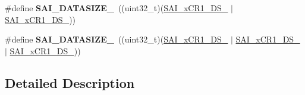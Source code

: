 \begin{DoxyCompactItemize}
\item 
\#define {\bfseries S\+A\+I\+\_\+\+D\+A\+T\+A\+S\+I\+Z\+E\+\_}~((uint32\+\_\+t)(\hyperlink{group___peripheral___registers___bits___definition_gab50b27e8638b16d12ef00e80bf0f097e}{S\+A\+I\+\_\+x\+C\+R1\+\_\+\+D\+S\+\_} $\vert$ \hyperlink{group___peripheral___registers___bits___definition_ga4148a11a2d9ac1a97da766bd585e5c8a}{S\+A\+I\+\_\+x\+C\+R1\+\_\+\+D\+S\+\_}))\hypertarget{group___s_a_i___block___data___size_gabd6017193da022783eb7d28454155f97}{}\label{group___s_a_i___block___data___size_gabd6017193da022783eb7d28454155f97}

\item 
\#define {\bfseries S\+A\+I\+\_\+\+D\+A\+T\+A\+S\+I\+Z\+E\+\_}~((uint32\+\_\+t)(\hyperlink{group___peripheral___registers___bits___definition_gab50b27e8638b16d12ef00e80bf0f097e}{S\+A\+I\+\_\+x\+C\+R1\+\_\+\+D\+S\+\_} $\vert$ \hyperlink{group___peripheral___registers___bits___definition_ga4148a11a2d9ac1a97da766bd585e5c8a}{S\+A\+I\+\_\+x\+C\+R1\+\_\+\+D\+S\+\_} $\vert$ \hyperlink{group___peripheral___registers___bits___definition_gabb5dd23287a176f80d241f0dfb8fcc7d}{S\+A\+I\+\_\+x\+C\+R1\+\_\+\+D\+S\+\_}))\hypertarget{group___s_a_i___block___data___size_ga51d3b17e920c9cae9f821e3e7c721144}{}\label{group___s_a_i___block___data___size_ga51d3b17e920c9cae9f821e3e7c721144}

\end{DoxyCompactItemize}


\subsection{Detailed Description}

